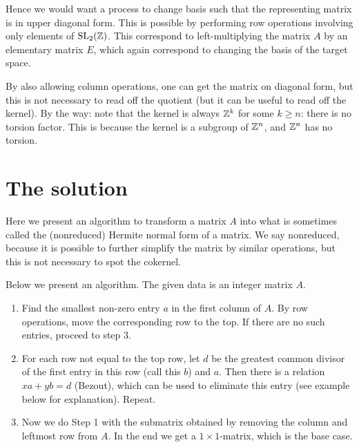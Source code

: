 \documentclass[11pt, english]{article}
\begin{document}
Hence we would want a process to change basis such that the representing matrix is in upper diagonal form. This is possible by performing row operations involving only elements of $\operatorname{SL}_2(\mathbb{Z})$. This correspond to left-multiplying the matrix $A$ by an elementary matrix $E$, which again correspond to changing the basis of the target space.

\begin{remark}
By also allowing column operations, one can get the matrix on diagonal form, but this is not necessary to read off the quotient (but it can be useful to read off the kernel). By the way: note that the kernel is always $\mathbb{Z}^k$ for some $k \geq n$: there is no torsion factor. This is because the kernel is a subgroup of $\mathbb{Z}^n$, and $\mathbb{Z}^n$ has no torsion.
\end{remark}

\section{The solution}

Here we present an algorithm to transform a matrix $A$ into what is sometimes called the (nonreduced) Hermite normal form of a matrix. We say nonreduced, because it is possible to further simplify the matrix by similar operations, but this is not necessary to spot the cokernel.

Below we present an algorithm. The given data is an integer matrix $A$.

\begin{enumerate}
	\item Find the smallest non-zero entry $a$ in the first column of $A$. By row operations, move the corresponding row to the top. If there are no such entries, proceed to step $3$.
	\item For each row not equal to the top row, let $d$ be the greatest common divisor of the first entry in this row (call this $b$) and $a$. Then there is a relation $xa+yb=d$ (Bezout), which can be used to eliminate this entry (see example below for explanation). Repeat.
	\item Now we do Step 1 with the submatrix obtained by removing the column and leftmost row from $A$. In the end we get a $1 \times 1$-matrix, which is the base case.
\end{enumerate}
\end{document}
